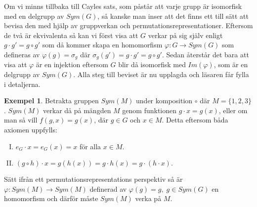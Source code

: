\documentclass{article}
\theoremstyle{definition}
\newtheorem{exmp}[thm]{Exempel}
\begin{document}
Om vi minns tillbaka till Cayles sats, som påstår att varje grupp är isomorfisk med en delgrupp
av $Sym(G)$, så kanske man inser att det finns ett till sätt att bevisa den med hjälp av 
gruppverkan och permutationsrepresentationer. Eftersom de två är ekvivalenta så kan vi 
först visa att $G$ verkar på sig själv enligt $g \cdot g' = g \circ g'$ 
som då kommer skapa en homomorfism
$\varphi: G \rightarrow Sym(G)$ som defineras av $\varphi(g) = \sigma_g$
där $\sigma_g(g') = g \cdot g' = g \circ g'$. Sedan återstår det 
bara att visa att $\varphi$ är en injektion eftersom $G$ blir då isomorfisk med $Im(\varphi)$, 
som är en delgrupp av $Sym(G)$. Alla steg till beviset är nu upplagda och läsaren får fylla i detaljerna.




\begin{exmp}
  Betrakta gruppen $Sym(M)$ under komposition $\circ$ där 
  $M = \{1, 2, 3\}$. $Sym(M)$ verkar då på mängden $M$
  genom funktionen $g \cdot x = g(x)$, eller om man så vill $f(g, x) = g(x)$, 
  där $g \in G$ och $x \in M$. Detta eftersom båda axiomen uppfylls:
  \begin{enumerate}[I)]
    \item $e_G \cdot x = e_G(x) = x$ för alla $x \in M$.
    \item $(g \circ h) \cdot x = g(h(x)) = g \cdot h(x) = g \cdot (h \cdot x).$
  \end{enumerate}
  Sätt ifrån ett permutationsrepresentations perspektiv så är 
  $\varphi: Sym(M) \rightarrow Sym(M)$ definerad av $\varphi(g) = g, \; g \in Sym(G)$
  en homomorfism och därför måste $Sym(M)$ verka på $M$.
\end{exmp}
\end{document}
